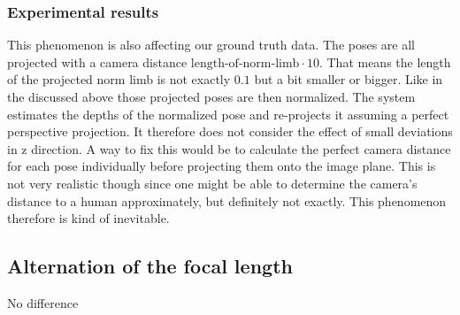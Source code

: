 \subsubsection{Experimental results}
	This phenomenon is also affecting our ground truth data. The poses are all projected with a camera distance $ \text{length-of-norm-limb} \cdot 10$. 
	That means the length of the projected norm limb is not exactly $0.1$ but a bit smaller or bigger. 
	Like in the discussed above those projected poses are then normalized. 
	The system estimates the depths of the normalized pose and re-projects it assuming a perfect perspective projection. 
	It therefore does not consider the effect of small deviations in z direction.
	A way to fix this would be to calculate the perfect camera distance for each pose individually before projecting them onto the image plane.
	This is not very realistic though since one might be able to determine the camera's distance to a human approximately, but definitely not exactly. This phenomenon therefore is kind of inevitable.


\subsection{Alternation of the focal length}
No difference

